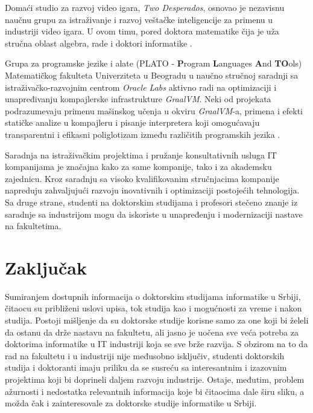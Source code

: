 \documentclass[a4paper]{article}
\begin{document}
Domaći studio za razvoj video igara, \textit{Two Desperados}, osnovao je nezavisnu naučnu grupu za istraživanje i razvoj veštačke inteligencije za primenu u industriji video igara. U ovom timu, pored doktora matematike čija je uža stručna oblast algebra, rade i doktori informatike \cite{twoDesp}.

Grupa za programske jezike i alate (PLATO - \textbf{P}rogram \textbf{L}anguages \textbf{A}nd \textbf{TO}ols) Matematičkog fakulteta Univerziteta u Beogradu u naučno stručnoj saradnji sa istraživačko-razvojnim centrom \textit{Oracle Labs} aktivno radi na optimizaciji i unapređivanju kompajlerske infrastrukture \textit{GraalVM}. Neki od projekata podrazumevaju primenu mašinskog učenja u okviru \textit{GraalVM}-a, primena i efekti statičke analize u kompajleru i pisanje interpretera koji omogućavaju transparentni i efikasni poliglotizam između različitih programskih jezika \cite{plato}.

Saradnja na istraživačkim projektima i pružanje konsultativnih usluga IT kompanijama je značajna kako za same kompanije, tako i za akademsku zajednicu. Kroz saradnju sa visoko kvalifikovanim stručnjacima kompanije napreduju zahvaljujući razvoju inovativnih i optimizaciji postojećih tehnologija. Sa druge strane, studenti na doktorskim studijama i profesori stečeno znanje iz saradnje sa industrijom mogu da iskoriste u unapređenju i modernizaciji nastave na fakultetima.


\section{Zaključak}
\label{sec:zakljucak}

Sumiranjem dostupnih informacija o doktorskim studijama informatike u Srbiji, čitaocu su približeni uslovi upisa, tok studija kao i mogućnosti za vreme i nakon studija. Postoji mišljenje da su doktorske studije korisne samo za one koji bi želeli da ostanu da drže nastavu na fakultetu, ali jasno je uočena sve veća potreba za doktorima informatike u IT industriji koja se sve brže razvija. S obzirom na to da rad na fakultetu i u industriji nije međusobno isključiv, studenti doktorskih studija i doktoranti imaju priliku da se susreću sa interesantnim i izazovnim projektima koji bi doprineli daljem razvoju industrije.
Ostaje, međutim, problem ažurnosti i nedostatka relevantnih informacija koje bi čitaocima dale širu sliku, a možda čak i zainteresovale za doktorske studije informatike u Srbiji.


\appendix
 

\end{document}
